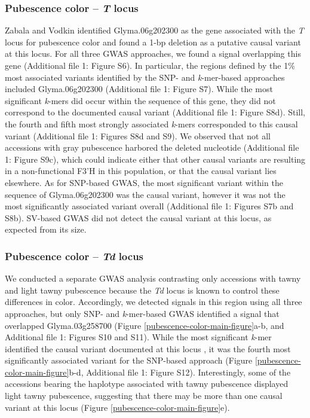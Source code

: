 \documentclass{article}
\begin{document}
\subsubsection*{Pubescence color -- \textit{T} locus}

Zabala and Vodkin \cite{zabala2003} identified Glyma.06g202300 as the gene associated with the
\textit{T} locus for pubescence color and found a 1-bp deletion as a putative
causal variant at this locus. For all three GWAS approaches, we found a signal
overlapping this gene (Additional file 1: Figure S6). In
particular, the regions defined by the 1\% most associated variants
identified by the SNP- and \textit{k}-mer-based approaches included
Glyma.06g202300 (Additional file 1: Figure S7). While the most
significant \textit{k}-mers did occur within the sequence of this gene, they
did not correspond to the documented causal variant (Additional file 1: Figure
S8d).  Still, the fourth and fifth most strongly
associated \textit{k}-mers corresponded to this causal variant (Additional file 1: Figures
S8d and S9). We
observed that not all accessions with gray pubescence harbored the deleted
nucleotide (Additional file 1: Figure S9c), which could indicate
either that other causal variants are resulting in a non-functional F3’H in
this population, or that the causal variant lies elsewhere. As for SNP-based GWAS,
the most significant variant within the sequence of Glyma.06g202300 was the
causal variant, however it was not the most significantly associated variant
overall (Additional file 1: Figures S7b and
S8b). SV-based GWAS did not detect the causal variant
at this locus, as expected from its size.

\subsubsection*{Pubescence color -- \textit{Td} locus}

We conducted a separate GWAS analysis contrasting only accessions with tawny
and light tawny pubescence because the \textit{Td} locus is known to control
these differences in color. Accordingly, we detected signals in this region
using all three approaches, but only SNP- and \textit{k}-mer-based GWAS
identified a signal that overlapped Glyma.03g258700 (Figure
\ref{pubescence-color-main-figure}a-b, and Additional file 1: Figures S10 and
S11).  While the most significant
\textit{k}-mer identified the causal variant documented at this locus
\citep{yan2020}, it was the fourth most significantly associated variant for
the SNP-based approach (Figure \ref{pubescence-color-main-figure}b-d, Additional file 1: Figure 
S12).  Interestingly, some of the accessions
bearing the haplotype associated with tawny pubescence displayed light tawny
pubescence, suggesting that there may be more than one causal variant at this
locus (Figure \ref{pubescence-color-main-figure}e).
\end{document}
